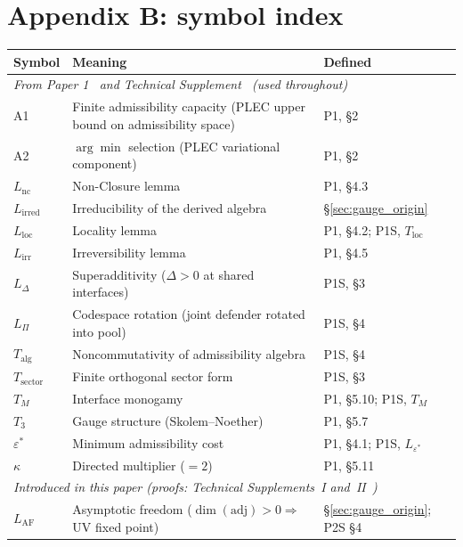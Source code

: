 \documentclass[11pt]{article}
\begin{document}
\section{Appendix B: symbol index}
\label{app:symbols}

\begin{center}
\small
\begin{tabular}{lp{8.5cm}l}
\toprule
\textbf{Symbol} & \textbf{Meaning} & \textbf{Defined} \\
\midrule
\multicolumn{3}{l}{\textit{From Paper 1~\cite{BrookePaper1} and Technical Supplement~\cite{BrookeSupplement} (used throughout)}} \\[2pt]
A1 & Finite admissibility capacity (PLEC upper bound on admissibility space) & P1, \S2 \\
A2 & $\arg\min$ selection (PLEC variational component) & P1, \S2 \\
$L_{\mathrm{nc}}$ & Non-Closure lemma & P1, \S4.3 \\
$L_{\mathrm{irred}}$ & Irreducibility of the derived algebra & \S\ref{sec:gauge_origin} \\
$L_{\mathrm{loc}}$ & Locality lemma & P1, \S4.2; P1S, $T_{\mathrm{loc}}$ \\
$L_{\mathrm{irr}}$ & Irreversibility lemma & P1, \S4.5 \\
$L_\Delta$ & Superadditivity ($\Delta > 0$ at shared interfaces) & P1S, \S3 \\
$L_\Pi$ & Codespace rotation (joint defender rotated into pool) & P1S, \S4 \\
$T_{\mathrm{alg}}$ & Noncommutativity of admissibility algebra & P1S, \S4 \\
$T_{\mathrm{sector}}$ & Finite orthogonal sector form & P1S, \S3 \\
$T_M$ & Interface monogamy & P1, \S5.10; P1S, $T_M$ \\
$T_3$ & Gauge structure (Skolem--Noether) & P1, \S5.7 \\
$\varepsilon^*$ & Minimum admissibility cost & P1, \S4.1; P1S, $L_{\varepsilon^*}$ \\
$\kappa$ & Directed multiplier ($= 2$) & P1, \S5.11 \\[4pt]
\multicolumn{3}{l}{\textit{Introduced in this paper (proofs: Technical Supplements~I and~II~\cite{BrookeP2Supplement,BrookeP2FoundSupplement})}} \\[2pt]
$L_{\mathrm{AF}}$ & Asymptotic freedom ($\dim(\mathrm{adj}) > 0 \Rightarrow$ UV fixed point) & \S\ref{sec:gauge_origin}; P2S \S4 \\

\end{tabular}
\end{center}
\end{document}
